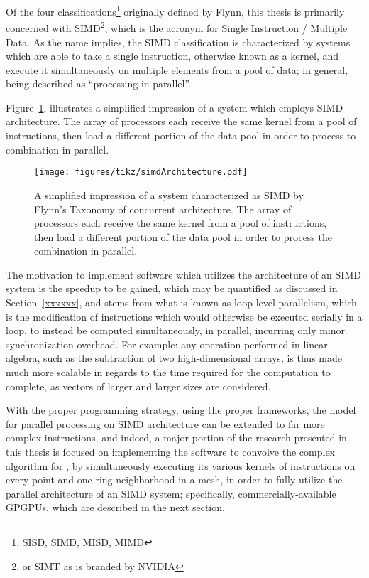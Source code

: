 Of the four classifications\footnote{SISD, SIMD, MISD, MIMD} originally defined by Flynn, this thesis is primarily concerned with SIMD\footnote{or SIMT as is branded by NVIDIA}, which is the acronym for Single Instruction / Multiple Data. As the name implies, the SIMD classification is characterized by systems which are able to take a single instruction, otherwise known as a kernel, and execute it simultaneously on multiple elements from a pool of data; in general, being described as ``processing in parallel''.

Figure~\ref{fig:simdArchitecture}, illustrates a simplified impression of a system which employs SIMD architecture. The array of processors each receive the same kernel from a pool of instructions, then load a different portion of the data pool in order to process to combination in parallel.

\begin{figure}[ht]
\ffigbox
	{\texttt{[image: figures/tikz/simdArchitecture.pdf]}}
	{\caption[SIMD Architecture]{A simplified impression of a system characterized as SIMD by Flynn's Taxonomy of concurrent architecture. The array of processors each receive the same kernel from a pool of instructions, then load a different portion of the data pool in order to process the combination in parallel.}\label{fig:simdArchitecture}}
\end{figure}

The motivation to implement software which utilizes the architecture of an SIMD system is the speedup to be gained, which may be quantified as discussed in Section~\ref{xxxxxx}, and stems from what is known as loop-level parallelism, which is the modification of instructions which would otherwise be executed serially in a loop, to instead be computed simultaneously, in parallel, incurring only minor synchronization overhead. For example: any operation performed in linear algebra, such as the subtraction of two high-dimensional arrays, is thus made much more scalable in regards to the time required for the computation to complete, as vectors of larger and larger sizes are considered.

With the proper programming strategy, using the proper frameworks, the model for parallel processing on SIMD architecture can be extended to far more complex instructions, and indeed, a major portion of the research presented in this thesis is focused on implementing the software to convolve the complex algorithm for , by simultaneously executing its various kernels of instructions on every point and one-ring neighborhood in a mesh, in order to fully utilize the parallel architecture of an SIMD system; specifically, commercially-available GPGPUs, which are described in the next section.

